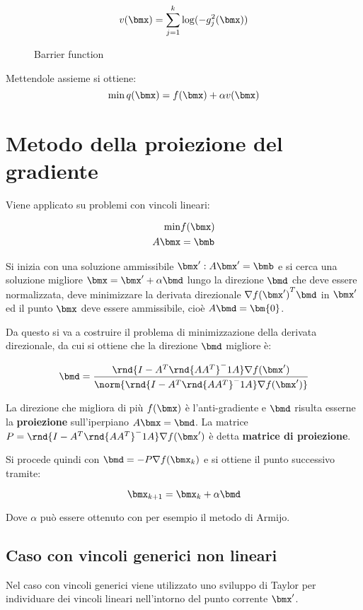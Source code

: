 \documentclass[\main/main.tex]{subfiles}
\begin{document}
\begin{figure}
    \[
        v(\bmx) = \sum_{j=1}^k \log(-g_j^2(\bmx))
    \]
    \caption{Barrier function}
\end{figure}

Mettendole assieme si ottiene:
\[
    \min q(\bmx) = f(\bmx) + \alpha v(\bmx)
\]

\section{Metodo della proiezione del gradiente}
Viene applicato su problemi con vincoli lineari:

\begin{align*}
    \min &f(\bmx)\\
    A\bmx &= \bmb
\end{align*}

Si inizia con una soluzione ammissibile \(\bmx':A\bmx' = \bmb \) e si cerca una soluzione migliore \(\bmx = \bmx' + \alpha\bmd \) lungo la direzione \(\bmd \) che deve essere normalizzata, deve minimizzare la derivata direzionale \(\nabla {f(\bmx')}^T\bmd \) in \(\bmx'\) ed il punto \(\bmx \) deve essere ammissibile, cioè \(A\bmd = \bm{0}\).

Da questo si va a costruire il problema di minimizzazione della derivata direzionale, da cui si ottiene che la direzione \(\bmd \) migliore è:

\[
    \bmd = \frac{\rnd{I - A^T\rnd{AA^T}^-1A}\nabla f(\bmx')}{\norm{\rnd{I - A^T\rnd{AA^T}^-1A}\nabla f(\bmx')}}
\]

La direzione che migliora di più \(f(\bmx)\) è l'anti-gradiente e \(\bmd \) risulta esserne la \textbf{proiezione} sull'iperpiano \(A\bmx = \bmd \). La matrice \(P = \rnd{I - A^T\rnd{AA^T}^-1A}\nabla f(\bmx')\) è detta \textbf{matrice di proiezione}.

Si procede quindi con \(\bmd = -P\nabla f(\bmx_k)\) e si ottiene il punto successivo tramite:

\[
    \bmx_{k+1} = \bmx_k + \alpha\bmd
\]

Dove \(\alpha \) può essere ottenuto con per esempio il metodo di Armijo.

\subsection{Caso con vincoli generici non lineari}
Nel caso con vincoli generici viene utilizzato uno sviluppo di Taylor per individuare dei vincoli lineari nell'intorno del punto corrente \(\bmx'\).
\end{document}
